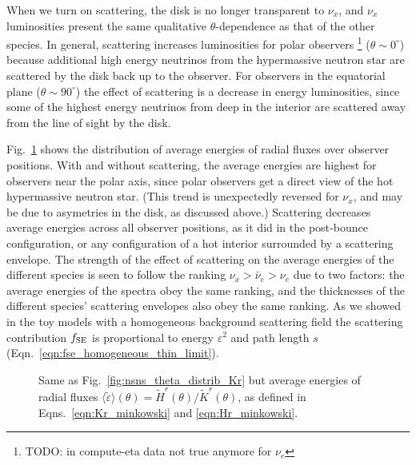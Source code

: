 \documentclass[aps,floatfix,prd,superscriptaddress,twocolumn]{revtex4-1}
\begin{document}
When we turn on scattering, the disk is no longer transparent to $\nu_x$,
and $\nu_x$ luminosities present the same qualitative $\theta$-dependence
as that of the other species.
In general, scattering increases luminosities for polar observers
\footnote{TODO: in compute-eta data not true anymore for $\nu_e$}
($\theta \sim 0^\circ$) because additional high energy neutrinos
from the hypermassive neutron star are scattered by the disk back up to
the observer.
For observers in the equatorial plane ($\theta \sim 90^\circ$)
the effect of scattering is a decrease in energy luminosities,
since some of the highest energy neutrinos from deep in the interior
are scattered away from the line of sight by the disk.

Fig.~\ref{fig:nsns_theta_distrib_avg_eps} shows the distribution of
average energies of radial fluxes over observer positions.
With and without scattering, the average energies are highest
for observers near the polar axis, since polar observers get a
direct view of the hot hypermassive neutron star.
(This trend is unexpectedly reversed for $\nu_x$,
and may be due to asymetries in the disk, as discussed above.)
Scattering decreases average energies across all observer positions,
as it did in the post-bounce configuration, or any configuration of
a hot interior surrounded by a scattering envelope.
The strength of the effect of scattering on the average energies of
the different species is seen to follow the ranking
$\nu_x>\bar{\nu}_e>\nu_e$ due to two factors:
the average energies of the spectra obey the same ranking,
and the thicknesses of the different species' scattering envelopes
also obey the same ranking.
As we showed in the toy models with a homogeneous background scattering field
the scattering contribution $f_{\rm SE}$ is
proportional to energy $\varepsilon^2$ and path length $s$
(Eqn.~\ref{eqn:fse_homogeneous_thin_limit}).
\begin{figure}
  \resizebox{\columnwidth}{!}{}
  \caption{Same as Fig.~\ref{fig:nsns_theta_distrib_Kr} but
    average energies of radial fluxes
    $\langle\tilde{\varepsilon}\rangle(\theta)=\tilde{H}^r(\theta)/\tilde{K}^r(\theta)$,
    as defined in Eqns.~\ref{eqn:Kr_minkowski} and \ref{eqn:Hr_minkowski}.
  }
  \label{fig:nsns_theta_distrib_avg_eps}
\end{figure}
\end{document}
